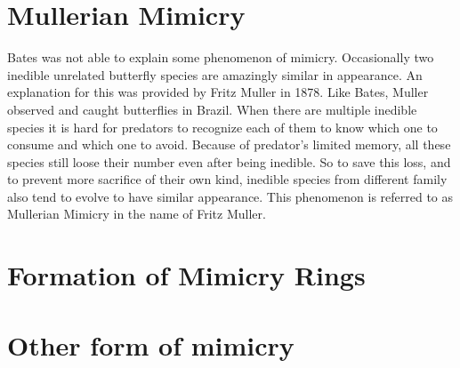 \section{Mullerian Mimicry}
Bates was not able to explain some phenomenon of mimicry. Occasionally two inedible unrelated butterfly species are amazingly similar in appearance. An explanation for this was provided by Fritz Muller in 1878. Like Bates, Muller observed and caught butterflies in Brazil. When there are multiple inedible species it is hard for predators to recognize each of them to know which one to consume and which one to avoid. Because of predator's limited memory, all these species still loose their number even after being inedible. So to save this loss, and to prevent more sacrifice of their own kind, inedible species from different family also tend to evolve to have similar appearance. This phenomenon is referred to as Mullerian Mimicry in the name of Fritz Muller.

\section{Formation of Mimicry Rings}

\section{Other form of mimicry}
